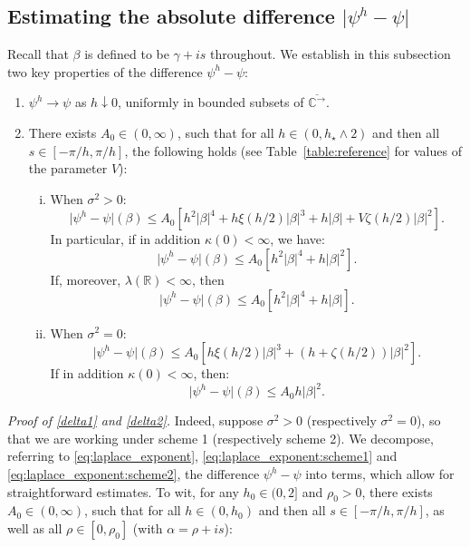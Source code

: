 \documentclass[pdftex,oneside,11pt,reqno]{amsart}
\theoremstyle{definition}
\theoremstyle{theorem}
\theoremstyle{remark}
\numberwithin{equation}{section}
\numberwithin{definition}{section}
\begin{document}
\subsection{Estimating the absolute difference $\vert \psi^h-\psi\vert$}\label{subsection:the_difference}
Recall that $\beta$ is defined to be $\gamma+is$ throughout. We establish in this subsection two key properties of the difference $\psi^h-\psi$: 
\begin{enumerate}[label=($\Delta_\arabic{*}$),ref=($\Delta_\arabic{*}$)]
\item\label{delta1} $\psi^h\to \psi$ as $h\downarrow 0$, uniformly in bounded subsets of ${\overline{\mathbb{C}^{\rightarrow}}}$. 
\item\label{delta2} There exists $A_0\in (0,\infty)$, such that for all $h\in (0,h_\star\land 2)$ and then all $s\in [-\pi/h,\pi/h]$, the following holds (see Table~\ref{table:reference} for values of the parameter $V$):
\begin{enumerate}[(i)]
\item When ${\sigma^2}>0$: $$\vert \psi^h-\psi\vert(\beta)\leq A_0\left[h^2\vert \beta\vert^4+h\xi(h/2)\vert \beta\vert^3+h\vert \beta \vert+V\zeta(h/2)\vert \beta\vert^2\right].$$ In particular, if in addition $\kappa(0)<\infty$, we have: $$\vert \psi^h-\psi\vert(\beta)\leq A_0[ h^2\vert \beta\vert^4+h\vert \beta\vert^2].$$ If, moreover, ${\lambda}({\mathbb R})<\infty$, then $$\vert \psi^h-\psi\vert(\beta)\leq A_0[h^2\vert \beta\vert^4+h\vert \beta\vert].$$
\item When ${\sigma^2}=0$: $$\vert \psi^h-\psi\vert(\beta)\leq A_0\left[h\xi(h/2)\vert \beta\vert^3+(h+\zeta(h/2))\vert \beta\vert^2\right].$$ If in addition $\kappa(0)<\infty$, then: $$\vert \psi^h-\psi\vert(\beta)\leq A_0h\vert \beta\vert^2.$$ 
\end{enumerate}
\end{enumerate}
\noindent \emph{Proof of \ref{delta1} and \ref{delta2}.}
Indeed, suppose ${\sigma^2}>0$ (respectively ${\sigma^2}=0$), so that we are working under scheme 1 (respectively scheme 2). We decompose, referring to \eqref{eq:laplace_exponent}, \eqref{eq:laplace_exponent:scheme1} and \eqref{eq:laplace_exponent:scheme2}, the difference $\psi^h-\psi$ into terms, which allow for straightforward estimates. To wit, for any $h_0\in (0,2]$ and $\rho_0>0$, there exists $A_0\in (0,\infty)$, such that for all $h\in (0,h_0)$ and then all $s\in [-\pi/h,\pi/h]$, as well as all $\rho\in [0,\rho_0]$  (with $\alpha=\rho+is$): 
\end{document}

